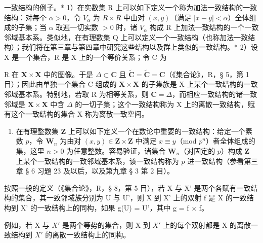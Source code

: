 一致结构的例子。* 1）在实数集 R 上可以如下定义一个称为加法一致结构的一致结构：对每个 \(\alpha > 0\)，令 \(V_{\alpha}\) 为 \(R \times R\) 中由对 \((x, y)\)（满足 \(|x - y| < \alpha\)）全体组成的子集；当 \(\alpha\) 取遍一切实数 \(> 0\) 时，诸 \(V_{\alpha}\) 构成 R 上加法一致结构的一个一致邻域基本系。类似地，在有理数集 Q 上可以定义一个一致结构（也称加法一致结构）；我们将在第三章与第四章中研究这些结构以及群上类似的一致结构。* 2）设 X 是一个集合，R 是 X 上的一个等价关系；令 C 为

R 在 \(\mathbf{X} \times \mathbf{X}\) 中的图像。于是 \(\Delta \subset \mathbf{C}\) 且 \(\tilde{\mathbf{C}} = \tilde{\mathbf{C}} = \mathbf{C}\)（《集合论》，R，§ 5，第 1 目）；因此由单独一个集合 C 组成的 \(\mathbf{X} \times \mathbf{X}\) 的子集族是 X 上某个一致结构的一致邻域基本系。特别地，若取 R 为相等关系，则 \(\mathbf{C} = \Delta\)，而相应一致结构的诸一致邻域是 \(\mathbf{X} \times \mathbf{X}\) 中含 \(\Delta\) 的一切子集；这个一致结构称为 X 上的离散一致结构，赋有这个一致结构的集合 X 称为离散一致空间。

\begin{enumerate}
\def\labelenumi{\arabic{enumi})}
\setcounter{enumi}{2}
\tightlist
\item
  在有理整数集 \(\mathbf{Z}\) 上可以如下定义一个在数论中重要的一致结构：给定一个素数 \(p\)，令 \(\mathbf{W}_n\) 为由对 \((x,y)\in \mathbf{Z}\times \mathbf{Z}\) 中满足 \(x\equiv y\)（mod \(p^n\)）者全体组成的集，这里 \(n > 0\) 为任意整数。容易验证，诸集合 \(\mathbf{W}_n\)（对固定的 \(p\)）构成 \(\mathbf{Z}\) 上某个一致结构的一致邻域基本系，该一致结构称为 \(p\) 进一致结构（参看第三章 § 6 习题 23 及以后，以及第九章 § 3 第 2 目）。
\end{enumerate}

按照一般的定义（《集合论》，R，§ 8，第 5 目），若 X 与 X' 是两个各赋有一致结构的集合，其一致邻域族分别为 U 与 U'，则 X 到 X' 上的双射 f 是 X 的一致结构到 X' 的一致结构上的同构，如果 g(U) = U'，其中 g = f × f。

例如，若 X 与 \(X'\) 是两个等势的集合，则 X 到 \(X'\) 上的每个双射都是 X 的离散一致结构到 \(X'\) 的离散一致结构上的同构。

